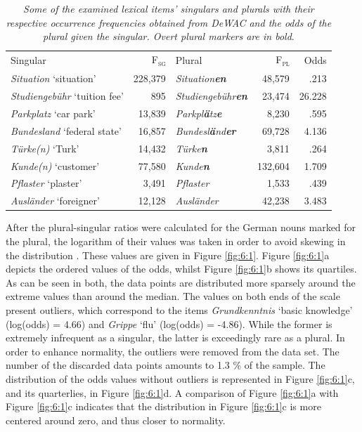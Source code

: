 \begin{table} 
\begin{small}
\begin{tabularx}{\textwidth}{l@{\hskip 20pt}r@{\hskip 20pt}l@{\hskip 20pt}r@{\hskip 20pt}r} 
    \midrule
	\addlinespace[2mm]
	Singular & \centering F\textsubscript{\textsc{sg}} & Plural & \centering F\textsubscript{\textsc{pl}} & Odds\\ \addlinespace[2mm] \midrule \addlinespace[2mm] 
	\textit{Situation} `situation' & 228,379 & \textit{Situation\textbf{en}} & 48,579 & .213\\  \midrule
	\textit{Studiengebühr} `tuition fee' & 895 & \textit{Studiengebühr\textbf{en}} & 23,474 & 26.228\\ \midrule
	\textit{Parkplatz} `car park' & 13,839 & \textit{Parkpl\textbf{ä}tz\textbf{e}} & 8,230 & .595\\ \midrule
	\textit{Bundesland} `federal state' & 16,857 & \textit{Bundesl\textbf{ä}nd\textbf{er}} & 69,728 & 4.136\\ \midrule
	\textit{Türke(n)} `Turk' & 14,432 & \textit{Türke\textbf{n}} & 3,811 & .264\\ \midrule
	\textit{Kunde(n)} `customer' & 77,580 & \textit{Kunde\textbf{n}} & 132,604 & 1.709\\ \midrule
	\textit{Pflaster} `plaster' & 3,491 & \textit{Pflaster} & 1,533 & .439\\ \midrule
	\textit{Ausländer} `foreigner' & 12,128 & \textit{Ausländer} & 42,238 & 3.483\\ \midrule  
	\end{tabularx}
	\end{small}
	\caption{\textit{Some of the examined lexical items’ singulars and plurals with their respective occurrence frequencies obtained from DeWAC and the odds of the plural given the singular. Overt plural markers are in bold}.}
\label{tab:6:5}
\end{table}

After the plural-singular ratios were calculated for the German nouns marked for the plural, the logarithm of their values was taken in order to avoid skewing in the distribution \citep[31]{baayen-analyzing}. These values are given in Figure \ref{fig:6:1}. Figure \ref{fig:6:1}a depicts the ordered values of the odds, whilst Figure \ref{fig:6:1}b shows its quartiles. As can be seen in both, the data points are distributed more sparsely around the extreme values than around the median. The values on both ends of the scale present outliers, which correspond to the items \textit{Grundkenntnis} `basic knowledge' (log(odds) = 4.66) and \textit{Grippe} `flu' (log(odds) = -4.86). While the former is extremely infrequent as a singular, the latter is exceedingly rare as a plural. In order to enhance normality, the outliers were removed from the data set. The number of the discarded data points amounts to 1.3 \% of the sample. The distribution of the odds values without outliers is represented in Figure \ref{fig:6:1}c, and its quarterlies, in Figure \ref{fig:6:1}d. A comparison of Figure \ref{fig:6:1}a with Figure \ref{fig:6:1}c indicates that the distribution in Figure \ref{fig:6:1}c is more centered around zero, and thus closer to normality.

